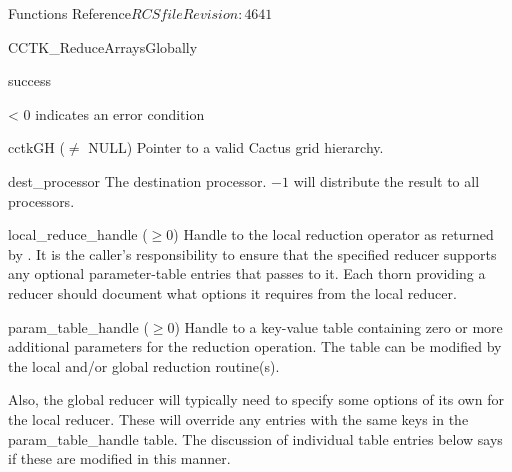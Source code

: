 \begin{cactuspart}{ Functions Reference}{$RCSfile$}{$Revision: 4641 $}
\begin{FunctionDescription}{CCTK\_ReduceArraysGlobally}
\begin{ResultSection}
\begin{Result}{0} success \end{Result}
\begin{Result}{< 0} indicates an error condition \end{Result}
\end{ResultSection}

\begin{ParameterSection}
\begin{Parameter}{cctkGH ($\ne$ NULL)}
Pointer to a valid Cactus grid hierarchy.
\end{Parameter}
\begin{Parameter}{dest\_processor}
The destination processor. $-1$ will distribute the result to all processors.
\end{Parameter}
\begin{Parameter}{local\_reduce\_handle ($\ge 0$)}
Handle to the local reduction operator as returned by \newline
{}. It is the caller's responsibility
to ensure that the specified reducer supports any optional
parameter-table entries that \newline {} passes to it.
Each thorn providing a \newline {} reducer should
document what options it requires from the local reducer.
\end{Parameter}
\begin{Parameter}{param\_table\_handle ($\ge 0$)}
Handle to a key-value table containing zero or more additional parameters
for the reduction operation. The table can be modified by the local
and/or global reduction routine(s).

Also, the global reducer will typically need to specify some options
of its own for the local reducer.  These will override any entries
with the same keys in the  param\_table\_handle  table.  The discussion
of individual table entries below says if these are modified in this
manner.


\end{Parameter}
\end{ParameterSection}
\end{FunctionDescription}
\end{cactuspart}
